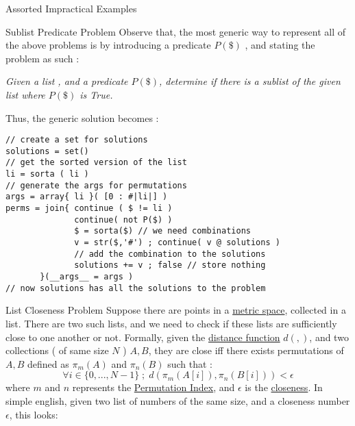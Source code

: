 \begin{section}{Assorted Impractical Examples}
\begin{subsection}{Sublist Predicate Problem}
Observe that, the most generic way to represent all of the above problems is by introducing 
a predicate $P(\$)$ , and stating the problem as such :
\begin{center}\emph{
Given a list , and a predicate $P(\$)$, determine if there is a sublist of the given list where $P(\$)$ is True.
}
\end{center}
Thus, the generic solution becomes :
\begin{center}\begin{minipage}{\linewidth}
\begin{lstlisting}[style=JexlStyle]
// create a set for solutions 
solutions = set()
// get the sorted version of the list 
li = sorta ( li )
// generate the args for permutations 
args = array{ li }( [0 : #|li|] )
perms = join{ continue ( $ != li )
              continue( not P($) ) 
              $ = sorta($) // we need combinations 
              v = str($,'#') ; continue( v @ solutions )
              // add the combination to the solutions
              solutions += v ; false // store nothing
       }(__args__ = args )
// now solutions has all the solutions to the problem 
\end{lstlisting}  
\end{minipage}\end{center}

\end{subsection}

\begin{subsection}{List Closeness Problem}
Suppose there are points in a \href{https://en.wikipedia.org/wiki/Metric\_space}{metric space},
collected in a list. There are two such lists, and we need to check if these lists are sufficiently close to 
one another or not. Formally, given the \href{https://en.wikipedia.org/wiki/Distance\#General\_metric}{distance function} $d(,)$,
and two collections ( of same size $N$ ) $A,B$, they are close iff there exists permutations of $A,B$ defined as $\pi_m(A)$ and $\pi_n(B)$
such that :
$$
\forall i \in \{ 0 , ... , N - 1 \} \; ; \; d( \pi_m(A[i]) , \pi_n(B[i]) ) < \epsilon  
$$   
where $m$ and $n$ represents the \href{http://mathworld.wolfram.com/PermutationIndex.html}{Permutation Index},
and $\epsilon$ is the \href{https://en.wikipedia.org/wiki/Closeness\_(mathematics)}{closeness}.
In simple english, given two list of numbers of the same size, and a closeness number $\epsilon$, this looks:
  

\end{subsection}
\end{section}

